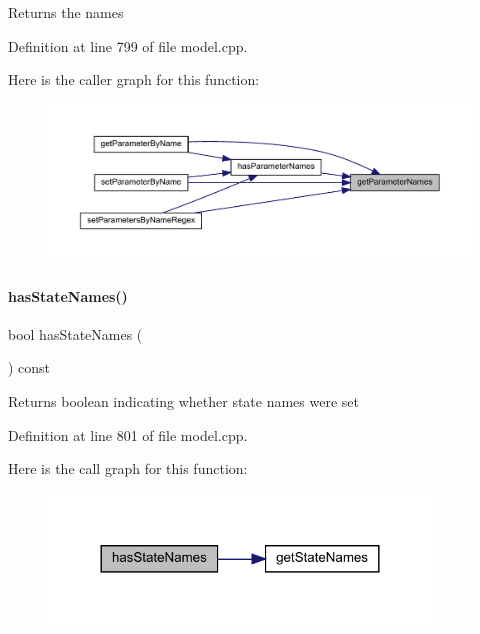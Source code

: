 \begin{DoxyReturn}{Returns}
the names 
\end{DoxyReturn}


Definition at line 799 of file model.\+cpp.

Here is the caller graph for this function\+:
\nopagebreak
\begin{figure}[H]
\begin{center}
\leavevmode
\includegraphics[width=350pt]{classamici_1_1_model_aa99eb9052c2bbddc98547a0ad9a3c7bf_icgraph}
\end{center}
\end{figure}
\mbox{\label{classamici_1_1_model_ae851580412b6a85e8cc4183715e428f6}} 
\paragraph{\texorpdfstring{hasStateNames()}{hasStateNames()}}
{\footnotesize\ttfamily bool has\+State\+Names (\begin{DoxyParamCaption}{ }\end{DoxyParamCaption}) const\hspace{0.3cm}{\ttfamily [virtual]}}

\begin{DoxyReturn}{Returns}
boolean indicating whether state names were set 
\end{DoxyReturn}


Definition at line 801 of file model.\+cpp.

Here is the call graph for this function\+:
\nopagebreak
\begin{figure}[H]
\begin{center}
\leavevmode
\includegraphics[width=288pt]{classamici_1_1_model_ae851580412b6a85e8cc4183715e428f6_cgraph}
\end{center}
\end{figure}
\mbox{\label{classamici_1_1_model_af0a035784f9fbea688512f2c7f211b92}} 
